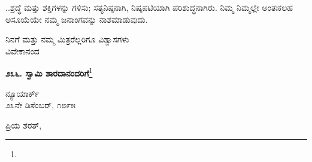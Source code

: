 ..ಶ್ರದ್ಧೆ ಮತ್ತು ಶಕ್ತಿಗಳನ್ನು ಗಳಿಸು; ಸತ್ಯನಿಷ್ಠನಾಗಿ, ನಿಷ್ಕಪಟಿಯಾಗಿ ಪರಿಶುದ್ಧನಾಗಿರು. ನಿಮ್ಮ ನಿಮ್ಮಲ್ಲೇ ಅಂತಃಕಲಹ ಅಸೂಯೆಯೇ ನಮ್ಮ ಜನಾಂಗವನ್ನು ನಾಶಮಾಡುವುದು.
\vspace{-0.2cm}

{\flushright
ನಿನಗೆ ಮತ್ತು ನಮ್ಮ ಮಿತ್ರರೆಲ್ಲರಿಗೂ ವಿಶ್ವಾಸಗಳು\\ವಿವೇಕಾನಂದ\par}
\vspace{-0.2cm}

\begin{center}
\textbf{೨೩೬. ಸ್ವಾಮಿ ಶಾರದಾನಂದರಿಗೆ}\footnote{}
\end{center}
\vspace{-0.5cm}

\begin{flushright}
ನ್ಯೂಯಾರ್ಕ್\\೨೩ನೇ ಡಿಸೆಂಬರ್, ೧೮೯೫
\end{flushright}
\vspace{-0.2cm}

\noindent
ಪ್ರಿಯ ಶರತ್,

